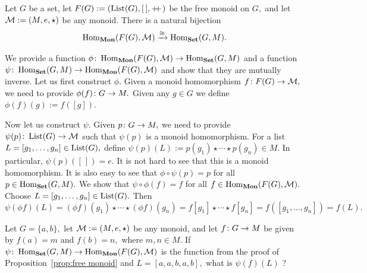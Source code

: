 \documentclass[../main/CT4S-EN-RU]{subfiles}
\begin{document}
\begin{blockRUS}
\end{blockRUS}

\begin{propositionENG}\label{prop:free monoid}
Let $G$ be a set, let $F(G):=(\operatorname{List}(G),[\,],+\!\!+\hspace{1pt})$ be the free monoid on $G,$ and let $\mathcal{M}:=(M,e,\star)$ be any monoid. There is a natural bijection
$$\operatorname{Hom}_{\mathbf{Mon}}(F(G),\mathcal{M})\xrightarrow{\cong}\operatorname{Hom}_{\mathbf{Set}}(G,M).$$
\end{propositionENG}

\begin{propositionRUS}\label{prop:free monoid}
\end{propositionRUS}

\begin{proofENG}
We provide a function $\phi\colon\operatorname{Hom}_{\mathbf{Mon}}(F(G),\mathcal{M})\rightarrow\operatorname{Hom}_{\mathbf{Set}}(G,M)$ and a function $\psi\colon\operatorname{Hom}_{\mathbf{Set}}(G,M)\rightarrow\operatorname{Hom}_{\mathbf{Mon}}(F(G),\mathcal{M})$ and show that they are mutually inverse. Let us first construct $\phi.$ Given a monoid homomorphism $f\colon F(G)\rightarrow\mathcal{M},$ we need to provide $\phi(f)\colon G\rightarrow M.$ Given any $g\in G$ we define $\phi(f)(g):=f([g]).$

Now let us construct $\psi.$ Given $p\colon G\rightarrow M,$ we need to provide $\psi(p)\colon\operatorname{List}(G)\rightarrow\mathcal{M}$ such that $\psi(p)$ is a monoid homomorphism. For a list $L=[g_1,\ldots,g_n]\in\operatorname{List}(G),$ define $\psi(p)(L):=p(g_1)\star\cdots\star p(g_n)\in M.$ In particular, $\psi(p)([\,])=e.$ It is not hard to see that this is a monoid homomorphism. It is also easy to see that $\phi\circ\psi(p)=p$ for all $p\in\operatorname{Hom}_{\mathbf{Set}}(G,M).$ We show that $\psi\circ\phi(f)=f$ for all $f\in\operatorname{Hom}_{\mathbf{Mon}}(F(G),\mathcal{M}).$ Choose $L=[g_1,\ldots,g_n]\in\operatorname{List}(G).$ Then
$$\psi(\phi f)(L)=(\phi f)(g_1)\star\cdots\star(\phi f)(g_n)=f[g_1]\star\cdots\star f[g_n]=f([g_1,\ldots,g_n])=f(L).$$
\end{proofENG}

\begin{proofRUS}
\end{proofRUS}

\begin{exerciseENG}
Let $G=\{a,b\},$ let $\mathcal{M}:=(M,e,\star)$ be any monoid, and let $f\colon G\rightarrow M$ be given by $f(a)=m$ and $f(b)=n,$ where $m,n\in M.$ If $\psi\colon\operatorname{Hom}_{\mathbf{Set}}(G,M)\rightarrow\operatorname{Hom}_{\mathbf{Mon}}(F(G),\mathcal{M})$ is the function from the proof of Proposition~\ref{prop:free monoid} and $L=[a,a,b,a,b],$ what is $\psi(f)(L)$ ?
\end{exerciseENG}

\begin{exerciseRUS}
\end{exerciseRUS}
\end{document}
